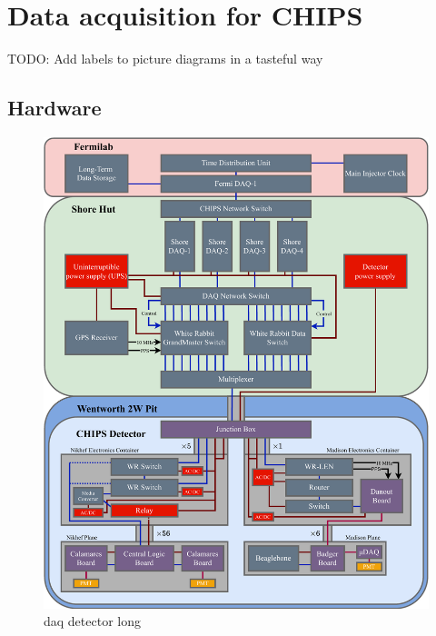 \chapter{Data acquisition for CHIPS} %
\label{chap:daq} %

TODO: Add labels to picture diagrams in a tasteful way

\section{Hardware} %
\label{sec:daq_hard} %

\begin{figure} %
    \includegraphics[width=\textwidth]{diagrams/5-daq/daq_detector.pdf}
    \caption[daq detector short]
    {daq detector long}
    \label{fig:daq_detector}
\end{figure}

